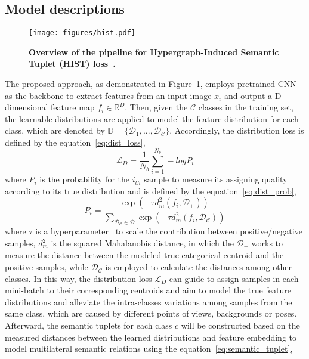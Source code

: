\subsection{Model descriptions}
\begin{figure}[ht!]
    \centering
    \texttt{[image: figures/hist.pdf]}
    \caption{\textbf{Overview of the pipeline for Hypergraph-Induced Semantic Tuplet (HIST) loss~\cite{lim2022hypergraph}.}}
   \label{fig:hist_archi}
\end{figure}
 The proposed approach, as demonstrated in Figure~\ref{fig:hist_archi}, employs pretrained CNN as the backbone to extract features from an input image $x_i$ and output a D-dimensional feature map $f_i \in \mathbb{R}^{D}$. Then, given the $\mathcal{C}$ classes in the training set, the learnable distributions are applied to model the feature distribution for each class, which are denoted by $\mathbb{D} = \{ \mathcal{D}_1, ...,\mathcal{D_C} \}$. Accordingly, the distribution loss is defined by the equation~\ref{eq:dist_loss}, 
\begin{equation}\label{eq:dist_loss}
\mathcal{L}_{D} = \frac{1}{N_{b}}\sum_{i=1}^{N_{b}}-logP_{i}
\end{equation}
where $P_{i}$ is the probability for the $i_{th}$ sample to measure its assigning quality according to its true distribution and is defined by the equation~\ref{eq:dist_prob}, 
\begin{equation}\label{eq:dist_prob}
P_{i} = \frac{\exp(-\tau d_{m}^{2}(f_{i}, \mathcal{D_+}))}{\sum_{\mathcal{D_C} \in \mathcal{D}}\exp(-\tau d_{m}^{2}(f_{i}, \mathcal{D_C}))}
\end{equation} 
where $\tau$ is a hyperparameter~\cite{hinton2015distilling} to scale the contribution between positive/negative samples, $d_{m}^{2}$ is the squared Mahalanobis distance, in which the $\mathcal{D_+}$ works to measure the distance between the modeled true categorical centroid and the positive samples, while $\mathcal{D_C}$ is employed to calculate the distances among other classes. In this way, the distribution loss $\mathcal{L}_{D}$ can guide to assign samples in each mini-batch to their corresponding centroids and aim to model the true feature distributions and alleviate the intra-classes variations among samples from the same class, which are caused by different points of views, backgrounds or poses. Afterward, the semantic tuplets for each class $c$ will be constructed based on the measured distances between the learned distributions and feature embedding to model multilateral semantic relations using the equation~\ref{eq:semantic_tuplet}, 
